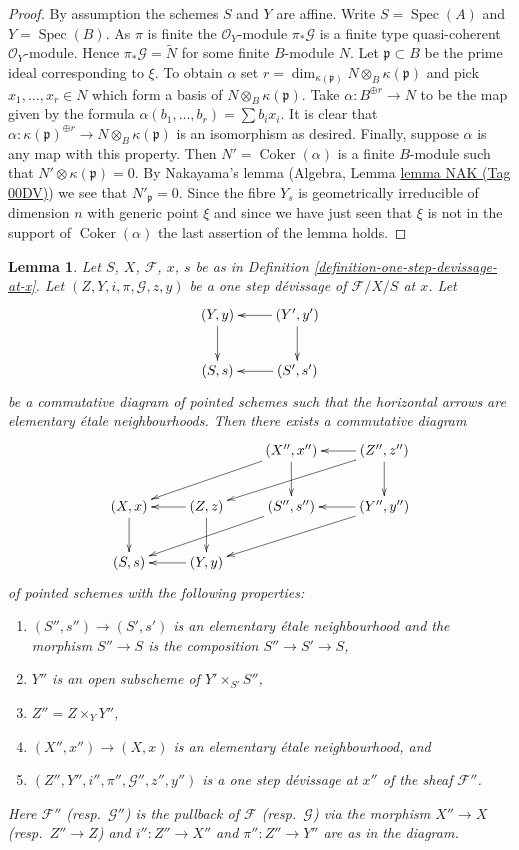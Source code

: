 \documentclass{amsart}
\theoremstyle{plain}
\newtheorem{lemma}[subsection]{Lemma}
\theoremstyle{definition}
\theoremstyle{remark}
\numberwithin{equation}{subsection}
\def\Spec{\mathop{\mathrm{Spec}}}
\def\Coker{\mathop{\mathrm{Coker}}}
\begin{document}
\begin{proof}
By assumption the schemes $S$ and $Y$ are affine.
Write $S = \Spec(A)$ and $Y = \Spec(B)$.
As $\pi$ is finite the $\mathcal{O}_Y$-module $\pi_*\mathcal{G}$
is a finite type quasi-coherent $\mathcal{O}_Y$-module.
Hence $\pi_*\mathcal{G} = \widetilde{N}$ for some finite $B$-module $N$.
Let $\mathfrak p \subset B$ be the prime ideal corresponding to $\xi$.
To obtain $\alpha$ set
$r = \dim_{\kappa(\mathfrak p)} N \otimes_B \kappa(\mathfrak p)$
and pick $x_1, \ldots, x_r \in N$ which form a basis of
$N \otimes_B \kappa(\mathfrak p)$. Take $\alpha : B^{\oplus r} \to N$
to be the map given by the formula $\alpha(b_1, \ldots, b_r) = \sum b_ix_i$.
It is clear that
$\alpha : \kappa(\mathfrak p)^{\oplus r} \to N \otimes_B \kappa(\mathfrak p)$
is an isomorphism as desired. Finally, suppose $\alpha$ is any map with this
property. Then $N' = \Coker(\alpha)$ is a finite $B$-module
such that $N' \otimes \kappa(\mathfrak p) = 0$. By Nakayama's lemma
(Algebra, Lemma \href{https://stacks.math.columbia.edu/tag/00DV}{lemma NAK (Tag 00DV)})
we see that $N'_{\mathfrak p} = 0$. Since the fibre $Y_s$ is
geometrically irreducible of dimension $n$ with generic point $\xi$
and since we have just seen that $\xi$ is not in the support of
$\Coker(\alpha)$ the last assertion of the lemma holds.
\end{proof}


\begin{lemma}
\label{lemma-elementary-etale-neighbourhood}
Let $S$, $X$, $\mathcal{F}$, $x$, $s$ be as in
Definition \ref{definition-one-step-devissage-at-x}.
Let $(Z, Y, i, \pi, \mathcal{G}, z, y)$ be a one step d\'evissage
of $\mathcal{F}/X/S$ at $x$. Let
$$
\xymatrix{
(Y, y) \ar[d] & (Y', y') \ar[l] \ar[d] \\
(S, s) & (S', s') \ar[l]
}
$$
be a commutative diagram of pointed schemes such that the horizontal
arrows are elementary \'etale neighbourhoods. Then there exists
a commutative diagram
$$
\xymatrix{
& & (X'', x'') \ar[lld] \ar[d] & (Z'', z'') \ar[l] \ar[lld] \ar[d] \\
(X, x) \ar[d] & (Z, z) \ar[l] \ar[d] &
(S'', s'') \ar[lld] & (Y'', y'') \ar[lld] \ar[l] \\
(S, s) & (Y, y) \ar[l]
}
$$
of pointed schemes with the following properties:
\begin{enumerate}
\item $(S'', s'') \to (S', s')$ is an elementary \'etale neighbourhood and
the morphism $S'' \to S$ is the composition $S'' \to S' \to S$,
\item $Y''$ is an open subscheme of $Y' \times_{S'} S''$,
\item $Z'' = Z \times_Y Y''$,
\item $(X'', x'') \to (X, x)$ is an elementary \'etale neighbourhood, and
\item $(Z'', Y'', i'', \pi'', \mathcal{G}'', z'', y'')$ is a one step
d\'evissage at $x''$ of the sheaf $\mathcal{F}''$.
\end{enumerate}
Here $\mathcal{F}''$ (resp.\ $\mathcal{G}''$) is the pullback of
$\mathcal{F}$ (resp.\ $\mathcal{G}$) via the morphism $X'' \to X$
(resp.\ $Z'' \to Z$) and $i'' : Z'' \to X''$ and $\pi'' : Z'' \to Y''$
are as in the diagram.
\end{lemma}
\end{document}
